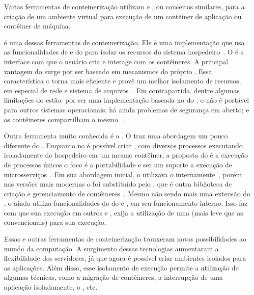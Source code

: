 Várias ferramentas de conteinerização utilizam \namespaces e \cgroups, ou conceitos similares, para a criação de um ambiente virtual para execução de um contêiner de aplicação ou contêiner de máquina.

\lxc é uma dessas ferramentas de conteinerização. Ele é uma implementação que usa as funcionalidades de \namespaces e \cgroups do \linux para isolar os recursos do sistema hospedeiro~\cite{watada2019emerging}. O \lxd é a interface com que o usuário cria e interage com os contêineres. A principal vantagem do \lxc surge por ser baseado em mecanismos do próprio . Essa característica o torna mais eficiente e provê um melhor isolamento de recursos, em especial de rede e sistema de arquivos~\cite{dua2014virtualization}. Em contrapartida, dentre algumas limitações do \lxc estão: por ser uma implementação baseada no  do \linux, o \lxc não é portável para outros sistemas operacionais; há ainda problemas de segurança em aberto; e os contêineres compartilham o mesmo ~\cite{dua2014virtualization}.

Outra ferramenta muito conhecida é o \docker. O \docker traz uma abordagem um pouco diferente do \lxc. Enquanto no \lxc é possível criar \vms, com diversos processos executando isoladamente do hospedeiro em um mesmo contêiner, a proposta do \docker é a execução de processos únicos \ie o foco é a portabilidade e ser um suporte a execução de microsserviços~\cite{lxcvsdocker}. Em sua abordagem inicial, o \docker utilizava o \lxc internamente~\cite{dua2014virtualization}, porém nas versões mais modernas o \lxc foi substituído pelo \conteinerd, que é outra biblioteca de criação e gerenciamento de contêineres~\cite{containerd}. Mesmo não sendo mais uma extensão do \lxc, o \docker ainda utiliza funcionalidades do  do \linux \eg \namespaces e \cgroups, em seu funcionamento interno. Isso faz com que sua execução em outros \sos \eg \mac e \windows, exija a utilização de uma \vm (mais leve que as convencionais) para sua execução.

Essas e outras ferramentas de conteinerização trouxeram novas possibilidades ao mundo da computação. A surgimento dessas tecnologias aumentaram a flexibilidade dos servidores, já que agora é possível criar ambientes isolados para as aplicações. Além disso, esse isolamento de execução permite a utilização de algumas técnicas, como a migração de contêineres, a interrupção de uma aplicação isoladamente, o \checkpointing, etc.


